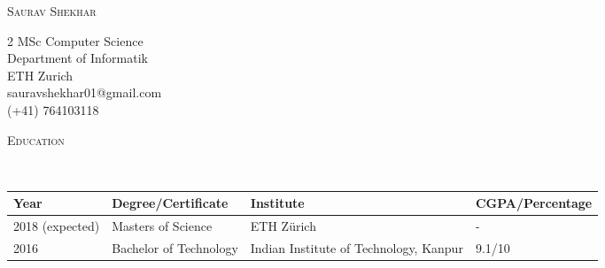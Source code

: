 \documentclass[9pt]{article}
\newenvironment{changemargin}[2]{%
  \begin{list}{}{%
    \setlength{\topsep}{0pt}%
    \setlength{\leftmargin}{#1}%
    \setlength{\rightmargin}{#2}%
    \setlength{\listparindent}{\parindent}%
    \setlength{\itemindent}{\parindent}%
    \setlength{\parsep}{\parskip}%
  }%
  \item[]}{\end{list}
}
\newcommand{\lineover}{
	\begin{changemargin}{-0.05in}{-0.10in}
		\vspace*{-9pt}
		\hrulefill \\
		\vspace*{-2pt}
	\end{changemargin}
}
\newcommand{\header}[1]{
	\begin{changemargin}{-0.5in}{-0.5in}
		\scshape{#1}\\
  	\lineover
	\end{changemargin}
}
\newcommand{\name}[1]{
	\begin{center}
	  	{\LARGE \scshape {#1}}
	\end{center}
}
\newcommand{\contact}[5]{
	\begin{changemargin}{-0.65in}{-0.65in}
		\begin{multicols}{2}
			{#1}\\ \smallskip 
			{#2}\\ \smallskip
			{#3}\\ \smallskip
			{#4}\\ \smallskip 
			{#5}\\ \smallskip
		\end{multicols}
	\end{changemargin}
}
\begin{document}
\name{Saurav Shekhar}
\contact{MSc Computer Science}{Department of Informatik}{ETH Zurich}
{{\hspace{130pt}}sauravshekhar01@gmail.com} {{\hspace{180pt}}(+41) 764103118}
 
\header{Education}

\vspace{4pt}
	\begin{tabular}{ | l | l | l | l | }
	\hline	
	\textbf{Year} & \textbf{Degree/Certificate} & \textbf{Institute} & \textbf{CGPA/Percentage} \\ \hline
	2018 (expected) & Masters of Science & ETH Z{\"u}rich & - \\ \hline
	2016 & Bachelor of Technology & Indian Institute of Technology, Kanpur & 9.1/10 \\ \hline
	\end{tabular}

\end{document}
